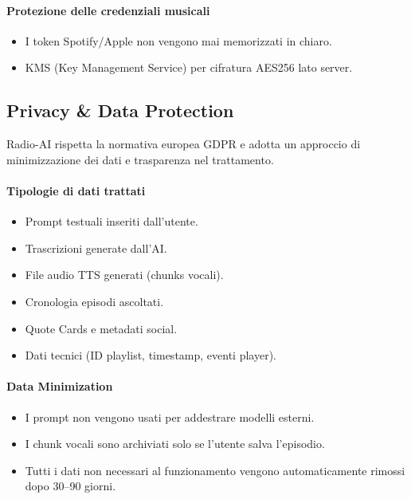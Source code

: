\documentclass[11pt,a4paper]{article}
\begin{document}
\paragraph{Protezione delle credenziali musicali}
\begin{itemize}
    \item I token Spotify/Apple non vengono mai memorizzati in chiaro.
    \item KMS (Key Management Service) per cifratura AES256 lato server.
\end{itemize}


\subsection{Privacy \& Data Protection}

Radio-AI rispetta la normativa europea GDPR e adotta un approccio di minimizzazione dei dati e trasparenza nel trattamento.

\paragraph{Tipologie di dati trattati}
\begin{itemize}
    \item Prompt testuali inseriti dall’utente.
    \item Trascrizioni generate dall’AI.
    \item File audio TTS generati (chunks vocali).
    \item Cronologia episodi ascoltati.
    \item Quote Cards e metadati social.
    \item Dati tecnici (ID playlist, timestamp, eventi player).
\end{itemize}

\paragraph{Data Minimization}
\begin{itemize}
    \item I prompt non vengono usati per addestrare modelli esterni.
    \item I chunk vocali sono archiviati solo se l’utente salva l’episodio.
    \item Tutti i dati non necessari al funzionamento vengono automaticamente rimossi dopo 30--90 giorni.
\end{itemize}
\end{document}
